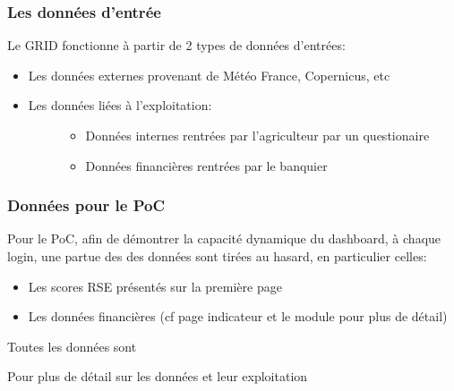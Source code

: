 \documentclass[letterpaper,10pt,french]{sphinxmanual}
\begin{document}
\subsubsection{Les données d’entrée}
\label{\detokenize{intro:les-donnees-d-entree}}
\sphinxAtStartPar
Le GRID fonctionne à partir de 2 types de données d’entrées:
\begin{itemize}
\item {} 
\sphinxAtStartPar
Les données externes provenant de Météo France, Copernicus, etc

\item {} \begin{description}
\item[{Les données liées à l’exploitation:}] \leavevmode\begin{itemize}
\item {} 
\sphinxAtStartPar
Données internes rentrées par l’agriculteur par un questionaire

\item {} 
\sphinxAtStartPar
Données financières rentrées par le banquier

\end{itemize}

\end{description}

\end{itemize}


\subsubsection{Données pour le PoC}
\label{\detokenize{intro:donnees-pour-le-poc}}
\sphinxAtStartPar
Pour le PoC, afin de démontrer la capacité dynamique du dashboard, à chaque login, une partue des des données sont tirées au hasard, en particulier celles:
\begin{itemize}
\item {} 
\sphinxAtStartPar
Les scores RSE présentés sur la première page

\item {} 
\sphinxAtStartPar
Les données financières (cf page indicateur et le module  pour plus de détail)

\end{itemize}

\sphinxAtStartPar
Toutes les données sont 

\sphinxAtStartPar
Pour plus de détail sur les données et leur exploitation {\hyperref[\detokenize{indicateurs:indic}]{}}
\end{document}
